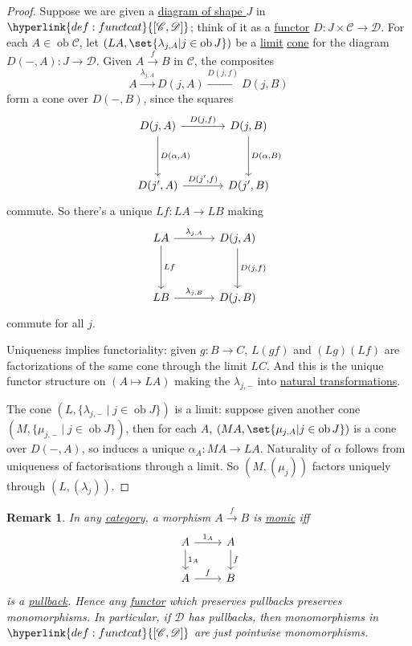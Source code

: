 \documentclass{article}
\DeclareMathOperator{\ob}{ob}
\newtheorem{nremark}[nthm]{Remark}
\begin{document}
\begin{proof}
  Suppose we are given a \hyperlink{def:diagram}{diagram of shape $J$} in $\hyperlink{def:functcat}{[\mathscr{C}, \mathscr{D}]}$; think of it as a \hyperlink{def:funct}{functor} $D: J \times \mathscr{C} \to \mathscr{D}$.
  For each $A \in \ob \mathscr{C}$, let $(LA, \set{\lambda_{j,A} | j \in \ob J})$ be a \hyperlink{def:limit}{limit} \hyperlink{def:cone}{cone} for the diagram $D(-, A): J \to \mathscr{D}$.
  Given $A \xrightarrow{f} B$ in $\mathscr{C}$, the composites
  \begin{equation*}
    A \xrightarrow{\lambda_{j,A}} D(j,A)\xrightarrow{D(j,f)} D(j,B)
  \end{equation*}
  form a cone over $D(-,B)$, since the squares
  \begin{equation*}
    \begin{tikzcd}[column sep=large, row sep=huge]
      {D(j,A)} \arrow[r, "{D(j,f)}"] \arrow[d, "{D(\alpha,A)}"] & {D(j,B)} \arrow[d, "{D(\alpha,B)}"] \\
      {D(j',A)} \arrow[r, "{D(j',f)}"] & {D(j',B)}
    \end{tikzcd}
  \end{equation*}
  commute.
  So there's a unique $Lf: LA \to LB$ making
  \begin{equation*}
    \begin{tikzcd}[column sep=large, row sep=huge]
    LA \rar{\lambda_{j,A}} \dar{Lf} & D(j,A) \dar{D(j,f)} \\
    LB \rar{\lambda_{j,B}} & D(j,B)
    \end{tikzcd}
  \end{equation*}
  commute for all $j$.

  Uniqueness implies functoriality: given $g: B \to C$, $L(gf)$ and $(Lg)(Lf)$ are factorizations of the same cone through the limit $LC$.
  And this is the unique functor structure on $(A \mapsto LA)$ making the $\lambda_{j, -}$ into \hyperlink{def:nattrans}{natural transformations}.

  The cone $(L, \{\lambda_{j, -} \mid j \in \ob J\})$ is a limit: suppose given another cone $(M, \{\mu_{j,-} \mid j \in \ob J\})$, then for each $A$, $(MA, \set{\mu_{j,A} | j \in \ob J})$ is a cone over $D(-,A)$, so induces a unique $\alpha_A: MA \to LA$.
  Naturality of $\alpha$ follows from uniqueness of factorisations through a limit.
  So $(M, (\mu_j))$ factors uniquely through $(L, (\lambda_j))$.
\end{proof}
\begin{nremark}\label{rem:4.8}
  In any \hyperlink{def:cat}{category}, a morphism $A \xrightarrow f B$ is \hyperlink{def:monic}{monic} iff
  \begin{equation*}
    \begin{tikzcd}
      A \rar{1_A} \dar{1_A} & A \dar{f}\\ A \rar{f} & B
    \end{tikzcd}
  \end{equation*}
    is a \hyperlink{def:pullback}{pullback}.
    Hence any \hyperlink{def:funct}{functor} which preserves pullbacks preserves monomorphisms.
    In particular, if $\mathscr{D}$ has pullbacks, then monomorphisms in $\hyperlink{def:functcat}{[\mathscr{C}, \mathscr{D}]}$ are just pointwise monomorphisms.
\end{nremark}
\end{document}
